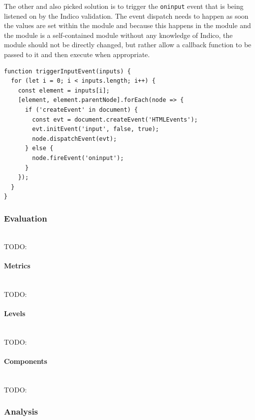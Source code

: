 The other and also picked solution is to trigger the \texttt{oninput} event that is being listened on by the Indico validation. The event dispatch needs to happen as soon the values are set within the module and because this happens in the module and the module is a self-contained module without any knowledge of Indico, the module should not be directly changed, but rather allow a callback function to be passed to it and then execute when appropriate.

\begin{lstlisting}[language=Other,columns=fullflexible, caption={Dispatching the \texttt{oninput} event within a callback.}, label={lst:oninput-callback}]
function triggerInputEvent(inputs) {
  for (let i = 0; i < inputs.length; i++) {
    const element = inputs[i];
    [element, element.parentNode].forEach(node => {
      if ('createEvent' in document) {
        const evt = document.createEvent('HTMLEvents');
        evt.initEvent('input', false, true);
        node.dispatchEvent(evt);
      } else {
        node.fireEvent('oninput');
      }
    });
  }
}
\end{lstlisting}

\subsubsection{Evaluation}\mbox{}\\

TODO:
\vspace{0.5cm}
\paragraph{Metrics}\mbox{}\\

TODO:
\vspace{0.5cm}
\paragraph{Levels}\mbox{}\\

TODO:
\vspace{0.5cm}
\paragraph{Components}\mbox{}\\

TODO:
\vspace{0.5cm}
\subsubsection{Analysis}\label{poc2:analysis}\mbox{}\\

